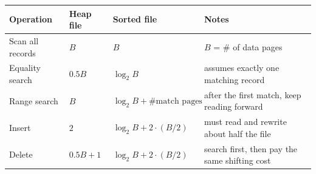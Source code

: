 {\small
\setlength{\tabcolsep}{6pt}
\renewcommand{\arraystretch}{1.2}
\begin{adjustbox}{max width=\textwidth}
\begin{tabular}{|L{3.1cm}|C{2.0cm}|C{4.0cm}|L{4.5cm}|}
\hline
{}
\textbf{Operation} & \textbf{Heap file} & \textbf{Sorted file} & \textbf{Notes} \\
\hline
Scan all records & $B$ & $B$ & $B$ = \# of data pages \\
\hline
Equality search & $0.5B$ & $\log_2 B$ & assumes exactly one matching record \\
\hline
Range search & $B$ & $\log_2 B + \#\text{match pages}$ & after the first match, keep reading forward \\
\hline
Insert & $2$ & $\log_2 B + 2\cdot(B/2)$ & must read and rewrite about half the file \\
\hline
Delete & $0.5B + 1$ & $\log_2 B + 2\cdot(B/2)$ & search first, then pay the same shifting cost \\
\hline
\end{tabular}
\end{adjustbox}
}
